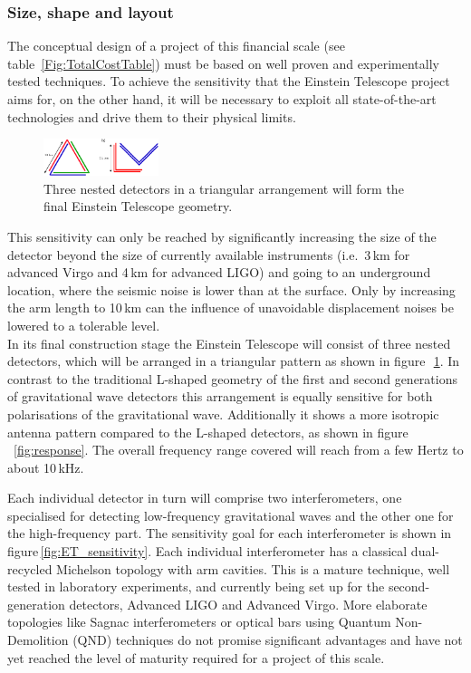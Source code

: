 \subsubsection{Size, shape and layout}
The conceptual design of a project of this financial scale (see table~\ref{Fig:TotalCostTable}) must be based on well proven and experimentally tested techniques. To achieve the sensitivity that the Einstein Telescope project aims for, on the other hand, it will be necessary to exploit all state-of-the-art technologies and drive them to their physical limits.
\begin{figure}
	\centering
		\includegraphics[width=0.3\textwidth]{Intro/Intro_Figures/NestedDetectors.pdf}
	\caption{Three nested detectors in a triangular arrangement will 
	form the final Einstein Telescope geometry.}
	\label{fig:NestedDetectors}
\end{figure}
This sensitivity can only be reached by significantly increasing the size of the 
detector beyond the size of currently available instruments (i.e.\ 3\,km for advanced Virgo 
and 4\,km for advanced LIGO) and going to an underground location, where the seismic 
noise is lower than at the surface. Only by increasing the arm length to 10\,km 
can the influence of unavoidable displacement noises be lowered to a tolerable 
level.\\
In its final construction stage the Einstein Telescope will consist of three nested
detectors, which will be arranged in a triangular pattern as shown in 
figure\,~\ref{fig:NestedDetectors}. 
In contrast to the traditional L-shaped geometry of the first and second generations 
of gravitational wave detectors this arrangement is equally sensitive for both 
polarisations of the gravitational wave. Additionally it shows a more isotropic 
antenna pattern compared to the L-shaped detectors, as shown in 
figure\,~\ref{fig:response}. The overall frequency range covered will reach from 
a few Hertz to about 10\,kHz.

Each individual detector in turn will comprise two interferometers, one 
specialised for detecting low-frequency gravitational waves and the other one 
for the high-frequency part. The sensitivity goal for each interferometer is shown 
in figure\,\ref{fig:ET_sensitivity}. %
Each individual interferometer has a classical dual-recycled Michelson topology 
with arm cavities. This is a mature technique, well tested in laboratory 
experiments, and currently being set up for the second-generation detectors, 
Advanced LIGO and Advanced Virgo. More elaborate topologies like Sagnac 
interferometers or optical bars using Quantum Non-Demolition (QND) techniques 
do not promise significant advantages and have not yet reached the level of 
maturity required for a project of this scale.\\

